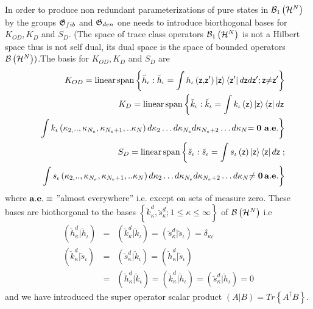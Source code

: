 In order to produce non redundant parameterizations of pure states in ${\cal %
B}_{1}\left( {\cal H}^{N}\right) $ by the groups ${\frak G}_{fib}$ and $%
{\frak G}_{den}$ one needs to introduce biorthogonal bases for $K_{OD},K_{D}$
and $S_{D}$. (The space of trace class operators ${\cal B}_{1}\left( {\cal H}%
^{N}\right) $ is not a Hilbert space thus is not self dual, its dual space
is the space of bounded operators ${\cal B}\left( {\cal H}^{N}\right) )$.The
basis for $K_{OD},K_{D}$ and $S_{D}$ are 
\begin{eqnarray}
&&K_{OD}={\rm linear\,span}\left\{ \breve{h}_{\iota }:\breve{h}_{\iota
}=\int h_{\iota }\left( {\sf z}{\bf ,}{\sf z}^{\prime }\right) \left| {\sf z}%
\right\rangle \left\langle {\sf z}^{\prime }\right| d{\sf z}d{\sf z}^{\prime
};{\sf z}{\bf \neq }{\sf z}^{\prime }\right\} \\
&&K_{D}={\rm linear\,span}\left\{ \breve{k}_{\iota }:\breve{k}_{\iota }=\int
k_{\iota }\left( {\sf z}\right) \left| {\sf z}\right\rangle \left\langle 
{\sf z}\right| d{\sf z}\right.  \nonumber \\
&&\left. \int k_{\iota }\left( \kappa _{2,}..,\kappa _{N_{e}},\kappa
_{N_{e}+1},..\kappa _{N}\right) d\kappa _{2}\ldots d\kappa _{N_{e}}d\kappa
_{N_{e}+2}\ldots d\kappa _{N}{\bf =0}\text{ }{\bf a.e.}\right\}
\label{kbasis} \\
&&S_{D}={\rm linear\,span}\left\{ \breve{s}_{\iota }:\breve{s}_{\iota }=\int
s_{\iota }\left( {\sf z}\right) \left| {\sf z}\right\rangle \left\langle 
{\sf z}\right| d{\sf z}\right. ;  \nonumber \\
&&\left. \int s_{\iota }\left( \kappa _{2,}..,\kappa _{N_{e}},\kappa
_{N_{e}+1},..\kappa _{N}\right) d\kappa _{2}\ldots d\kappa _{N_{e}}d\kappa
_{N_{e}+2}\ldots d\kappa _{N}{\bf \neq 0\,a.e.}\right\}  \label{sbasis}
\end{eqnarray}%
where ${\bf a.e.\equiv }$ ''almost everywhere'' i.e. except on sets of
measure zero. These bases are biothorgonal to the bases $\left\{ \breve{k}%
_{\kappa }^{d},\breve{s}_{\kappa }^{d};1\leq \kappa \leq \infty \right\} $
of ${\cal B}\left( {\cal H}^{N}\right) $ i.e 
\begin{eqnarray}
\left( \breve{h}_{\kappa }^{d}|\breve{h}_{\iota }\right) &=&\left( \breve{k}%
_{\kappa }^{d}|\breve{k}_{\iota }\right) =\left( \breve{s}_{\kappa }^{d}|%
\breve{s}_{\iota }\right) =\delta _{\kappa \iota }  \nonumber \\
\left( \breve{k}_{\kappa }^{d}|\breve{s}_{\iota }\right) &=&\left( \breve{s}%
_{\kappa }^{d}|\breve{k}_{\iota }\right) =\left( \breve{h}_{\kappa }^{d}|%
\breve{s}_{\iota }\right)  \nonumber \\
&=&\left( \breve{h}_{\kappa }^{d}|\breve{k}_{\iota }\right) =\left( \breve{k}%
_{\kappa }^{d}|\breve{h}_{\iota }\right) =\left( \breve{s}_{\kappa }^{d}|%
\breve{h}_{\iota }\right) =0
\end{eqnarray}%
and we have introduced the super operator scalar product $\left( A|B\right)
=Tr\left\{ A^{\dagger }B\right\} $.

